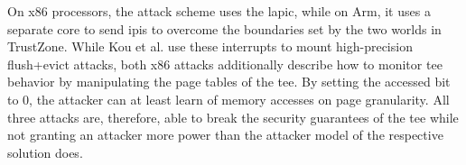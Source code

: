 On x86 processors, the attack scheme uses the \gls{lapic}, while on Arm, it uses
a separate core to send \glspl{ipi} to overcome the boundaries
set by the two worlds in TrustZone. While Kou et al. use these interrupts to
mount high-precision flush+evict attacks, both x86 attacks additionally describe
how to monitor \gls{tee} behavior by manipulating the page tables of the
\gls{tee}. By setting the accessed bit to 0, the attacker can at least learn of
memory accesses on page granularity. All three attacks are, therefore, able to
break the security guarantees of the \gls{tee} while not granting an attacker
more power than the attacker model of the respective solution does.
